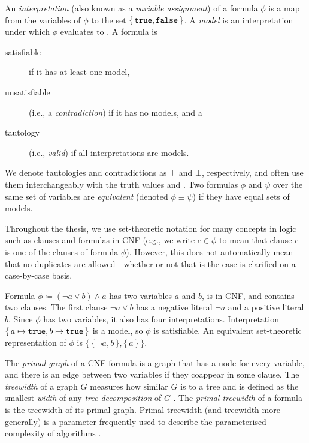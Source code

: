 An \emph{interpretation} (also known as a \emph{variable assignment}) of a
formula $\phi$ is a map from the variables of $\phi$ to the set
$\{\, \texttt{true}{}, \texttt{false}{} \,\}$. A \emph{model} is an interpretation under which
$\phi$ evaluates to \true{}. A formula is
\begin{description}
\item[satisfiable] if it has at least one model,
\item[unsatisfiable] (i.e., a \emph{contradiction}) if it has no models, and a
\item[tautology] (i.e., \emph{valid}) if all interpretations are models.
\end{description}
We denote tautologies and contradictions as $\top$ and $\bot$, respectively, and
often use them interchangeably with the truth values \true{} and \false{}. Two
formulas $\phi$ and $\psi$ over the same set of variables are \emph{equivalent}
(denoted $\phi \equiv \psi$) if they have equal sets of models.

Throughout the thesis, we use set-theoretic notation for many concepts in logic
such as clauses and formulas in CNF (e.g., we write $c \in \phi$ to mean that
clause $c$ is one of the clauses of formula $\phi$). However, this does not
automatically mean that no duplicates are allowed---whether or not that is the
case is clarified on a case-by-case basis.

\begin{example}\label{example:logic}
  Formula $\phi \coloneqq (\neg a \lor b) \land a$ has two variables $a$ and
  $b$, is in CNF, and contains two clauses. The first clause $\neg a \lor b$ has
  a negative literal $\neg a$ and a positive literal $b$. Since $\phi$ has two
  variables, it also has four interpretations. Interpretation
  $\{\, a \mapsto \texttt{true}{}, b \mapsto \texttt{true}{} \,\}$ is a model, so $\phi$ is
  satisfiable. An equivalent set-theoretic representation of $\phi$ is
  $\{\, \{\, \neg a, b \,\}, \{\, a \,\} \,\}$.
\end{example}

The \emph{primal graph} of a CNF formula is a graph that has a node for every
variable, and there is an edge between two variables if they coappear in some
clause. The \emph{treewidth} of a graph $G$ measures how similar $G$ is to a
tree and is defined as the smallest \emph{width} of any \emph{tree
  decomposition} of $G$ \citep{DBLP:journals/jct/RobertsonS84}. The \emph{primal
  treewidth} of a formula is the treewidth of its primal graph. Primal treewidth
(and treewidth more generally) is a parameter frequently used to describe the
parameterised complexity of algorithms
\citep{DBLP:conf/ijcai/BliemMMW17,DBLP:series/txcs/DowneyF13,DBLP:conf/lics/FichteHP20}.

